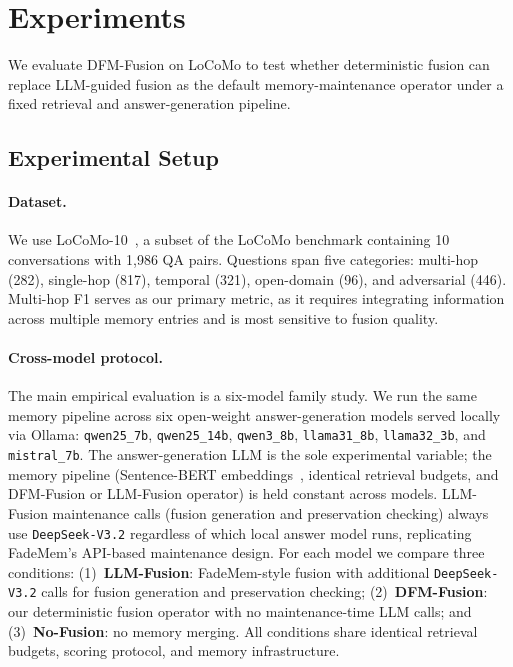 \section{Experiments}
\label{sec:experiments}

We evaluate DFM-Fusion on LoCoMo to test whether deterministic fusion can replace LLM-guided fusion as the default memory-maintenance operator under a fixed retrieval and answer-generation pipeline.

\subsection{Experimental Setup}

\paragraph{Dataset.}
We use LoCoMo-10~\citep{Maharana2024EvaluatingVL}, a subset of the LoCoMo benchmark containing 10 conversations with 1,986 QA pairs. Questions span five categories: multi-hop (282), single-hop (817), temporal (321), open-domain (96), and adversarial (446). Multi-hop F1 serves as our primary metric, as it requires integrating information across multiple memory entries and is most sensitive to fusion quality.

\paragraph{Cross-model protocol.}
The main empirical evaluation is a six-model family study. We run the same memory pipeline across six open-weight answer-generation models served locally via Ollama: \texttt{qwen25\_7b}, \texttt{qwen25\_14b}, \texttt{qwen3\_8b}, \texttt{llama31\_8b}, \texttt{llama32\_3b}, and \texttt{mistral\_7b}. The answer-generation LLM is the sole experimental variable; the memory pipeline (Sentence-BERT embeddings~\citep{Reimers2019SentenceBERTSE}, identical retrieval budgets, and DFM-Fusion or LLM-Fusion operator) is held constant across models. LLM-Fusion maintenance calls (fusion generation and preservation checking) always use \texttt{DeepSeek-V3.2} regardless of which local answer model runs, replicating FadeMem's API-based maintenance design. For each model we compare three conditions: (1)~\textbf{LLM-Fusion}: FadeMem-style fusion with additional \texttt{DeepSeek-V3.2} calls for fusion generation and preservation checking; (2)~\textbf{DFM-Fusion}: our deterministic fusion operator with no maintenance-time LLM calls; and (3)~\textbf{No-Fusion}: no memory merging. All conditions share identical retrieval budgets, scoring protocol, and memory infrastructure.

